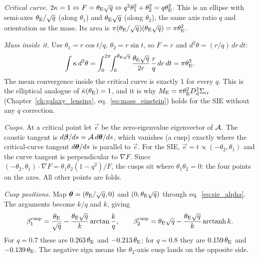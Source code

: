 \begin{derivation}
\textit{Critical curve.}  $2\kappa = 1 \Leftrightarrow F = \theta_{\mathrm{E}}\sqrt{q}
\Leftrightarrow q^2\theta_1^2 + \theta_2^2 = q\theta_{\mathrm{E}}^2$.  This is an ellipse
with semi-axes $\theta_{\mathrm{E}}/\sqrt{q}$ (along $\theta_1$) and $\theta_{\mathrm{E}}\sqrt{q}$
(along $\theta_2$), the same axis ratio $q$ and orientation as the mass.  Its
area is $\pi(\theta_{\mathrm{E}}/\sqrt{q})(\theta_{\mathrm{E}}\sqrt{q}) = \pi\theta_{\mathrm{E}}^2$.

\textit{Mass inside it.}  Use $\theta_1 = r\cos t/q$, $\theta_2 = r\sin t$, so
$F = r$ and $d^2\theta = (r/q)\,dr\,dt$:
\[
  \int\kappa\,d^2\theta = \int_0^{2\pi}\!\!\int_0^{\theta_{\mathrm{E}}\sqrt{q}}
  \frac{\theta_{\mathrm{E}}\sqrt{q}}{2r}\,\frac{r}{q}\,dr\,dt = \pi\theta_{\mathrm{E}}^2 .
\]
The mean convergence inside the critical curve is exactly 1 for every $q$.
This is the elliptical analogue of $\bar{\kappa}(\theta_{\mathrm{E}}) = 1$, and it is why
$M_{\mathrm{E}} = \pi\theta_{\mathrm{E}}^2D_{\mathrm{d}}^2\Sigma_{\mathrm{cr}}$ (Chapter~\ref{ch:galaxy_lensing},
eq.~\eqref{eq:mass_einstein}) holds for the SIE without any $q$ correction.

\textit{Cusps.}  At a critical point let $\vec{e}$ be the zero-eigenvalue
eigenvector of $\mathcal{A}$.  The caustic tangent is
$d\boldsymbol{\beta}/ds = \mathcal{A}\,d\boldsymbol{\theta}/ds$, which vanishes (a cusp) exactly where the
critical-curve tangent $d\boldsymbol{\theta}/ds$ is parallel to $\vec{e}$.  For the SIE,
$\vec{e} = \hat{t} \propto (-\theta_2,\theta_1)$ and the curve tangent is
perpendicular to $\nabla F$.  Since
$(-\theta_2,\theta_1)\cdot\nabla F = \theta_1\theta_2(1-q^2)/F$, the cusps sit
where $\theta_1\theta_2 = 0$: the four points on the axes.  All other points
are folds.

\textit{Cusp positions.}  Map $\boldsymbol{\theta} = (\theta_{\mathrm{E}}/\sqrt{q},0)$ and
$(0,\theta_{\mathrm{E}}\sqrt{q})$ through eq.~\eqref{eq:sie_alpha}.  The arguments become
$k/q$ and $k$, giving
\[
  \beta_1^{\mathrm{cusp}} = \frac{\theta_{\mathrm{E}}}{\sqrt{q}} - \frac{\theta_{\mathrm{E}}\sqrt{q}}{k}\arctan\frac{k}{q},
  \qquad
  \beta_2^{\mathrm{cusp}} = \theta_{\mathrm{E}}\sqrt{q} - \frac{\theta_{\mathrm{E}}\sqrt{q}}{k}\operatorname{arctanh}k .
\]
For $q = 0.7$ these are $0.263\,\theta_{\mathrm{E}}$ and $-0.213\,\theta_{\mathrm{E}}$; for $q = 0.8$
they are $0.159\,\theta_{\mathrm{E}}$ and $-0.139\,\theta_{\mathrm{E}}$.  The negative sign means the
$\theta_2$-axis cusp lands on the opposite side.
\end{derivation}

